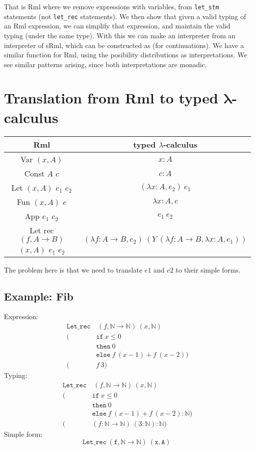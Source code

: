 \documentclass[11pt, leqno]{article}
\begin{document}
That is Rml where we remove expressions with variables, from \texttt{let\_stm} statements (not \texttt{let\_rec} statements). We then show that given a valid typing of an Rml expression, we can simplify that expression, and maintain the valid typing (under the same type). With this we can make an interpreter from an interpreter of sRml, which can be constructed as (for continuations). We have a similar function for Rml, using the posibility distributions as interpretations. We see similar patterns arising, since both interpretations are monadic.

\section{Translation from Rml to typed $\mathbf{\lambda}$-calculus}
\begin{center}
  \begin{tabular}{|c|c|}
    \hline
    Rml & typed $\lambda$-calculus \\ \hline
    Var $(x,A)$ & $x : A$ \\
    Const $A$ $c$ & $c : A$ \\
    Let $(x,A)$ $e_1$ $e_2$ & $(\lambda x : A, e_2)~e_1$ \\
    Fun $(x,A)$ $e$ & $\lambda x : A, e$ \\
    App $e_1$ $e_2$ & $e_1~e_2$ \\
    Let rec $(f,A \rightarrow B)$ $(x,A)$ $e_1$ $e_2$ & $(\lambda f : A \rightarrow B, e_2)~(Y~(\lambda f : A \rightarrow B, \lambda x : A, e_1))$ \\ \hline
  \end{tabular}
\end{center}
The problem here is that we need to translate \(e1\) and \(e2\) to their simple forms.

\subsection{Example: Fib}
Expression:
\begin{align*}
\mathtt{Let\_rec}&~(f,\mathbb{N} \rightarrow \mathbb{N})~(x,\mathbb{N})~\\
  (&\mathtt{if}~x \leq 0\\
                 &\mathtt{then}~0\\
                 &\mathtt{else}~f~(x - 1) + f~(x-2))\\
  (&f~3)
\end{align*}
Typing:
\begin{align*}
\mathtt{Let\_rec}&~(f,\mathbb{N} \rightarrow \mathbb{N})~(x,\mathbb{N})~\\
  (&\mathtt{if}~x \leq 0\\
                 &\mathtt{then}~0\\
                 &\mathtt{else}~f~(x - 1) + f~(x-2) : \mathbb{N})\\
  (&(f : \mathbb{N} \rightarrow \mathbb{N})~(3 : \mathbb{N}) : \mathbb{N})
\end{align*}
Simple form:
\[\mathtt{Let\_rec~(f,\mathbb{N} \rightarrow \mathbb{N})~(x,A)~}\]
\end{document}
